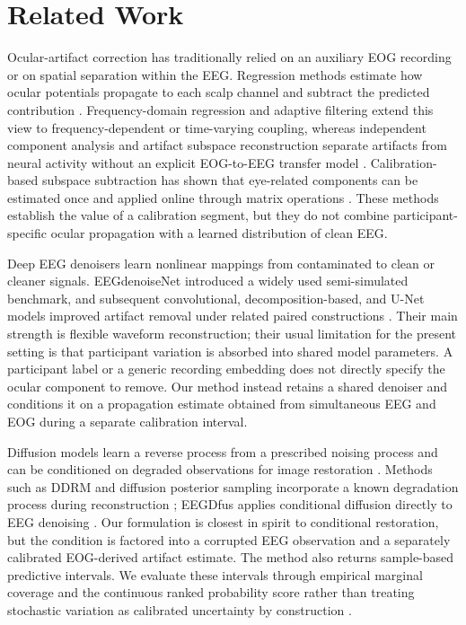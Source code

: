 \section{Related Work}
\label{sec:related-work}

Ocular-artifact correction has traditionally relied on an auxiliary EOG recording or on spatial separation within the EEG. Regression methods estimate how ocular potentials propagate to each scalp channel and subtract the predicted contribution \cite{gratton1983ocular,semlitsch1986ocular}. Frequency-domain regression and adaptive filtering extend this view to frequency-dependent or time-varying coupling, whereas independent component analysis and artifact subspace reconstruction separate artifacts from neural activity without an explicit EOG-to-EEG transfer model \cite{jung2000bss,chang2020asr}. Calibration-based subspace subtraction has shown that eye-related components can be estimated once and applied online through matrix operations \cite{kobler2020sgeyesub}. These methods establish the value of a calibration segment, but they do not combine participant-specific ocular propagation with a learned distribution of clean EEG.

Deep EEG denoisers learn nonlinear mappings from contaminated to clean or cleaner signals. EEGdenoiseNet introduced a widely used semi-simulated benchmark, and subsequent convolutional, decomposition-based, and U-Net models improved artifact removal under related paired constructions \cite{zhang2021eegdenoisenet,sun2020rescnn,yu2022deepseparator,chuang2022icunet,lai2024cleegn}. Their main strength is flexible waveform reconstruction; their usual limitation for the present setting is that participant variation is absorbed into shared model parameters. A participant label or a generic recording embedding does not directly specify the ocular component to remove. Our method instead retains a shared denoiser and conditions it on a propagation estimate obtained from simultaneous EEG and EOG during a separate calibration interval.

Diffusion models learn a reverse process from a prescribed noising process and can be conditioned on degraded observations for image restoration \cite{ho2020ddpm,song2021scoresde,saharia2022palette}. Methods such as DDRM and diffusion posterior sampling incorporate a known degradation process during reconstruction \cite{kawar2022ddrm,chung2023dps}; EEGDfus applies conditional diffusion directly to EEG denoising \cite{huang2025eegdfus}. Our formulation is closest in spirit to conditional restoration, but the condition is factored into a corrupted EEG observation and a separately calibrated EOG-derived artifact estimate. The method also returns sample-based predictive intervals. We evaluate these intervals through empirical marginal coverage and the continuous ranked probability score rather than treating stochastic variation as calibrated uncertainty by construction \cite{gneiting2007strictly}.
